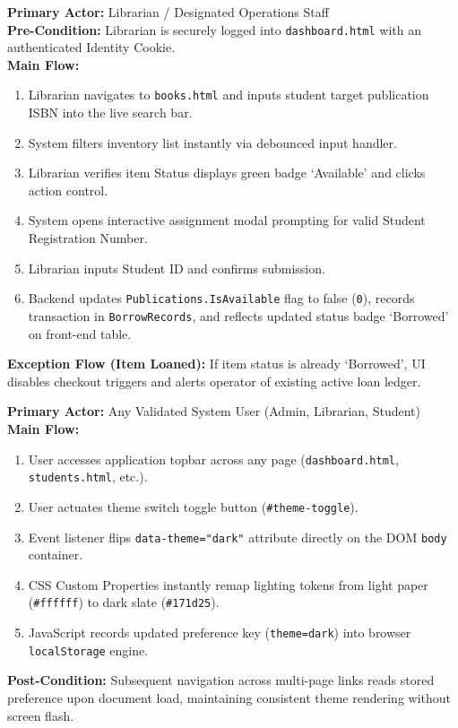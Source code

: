 \documentclass[10pt,journal,compsoc]{IEEEtran}
\begin{document}
\begin{engbox}
\textbf{Primary Actor:} Librarian / Designated Operations Staff\\
\textbf{Pre-Condition:} Librarian is securely logged into \texttt{dashboard.html} with an authenticated Identity Cookie.\\
\textbf{Main Flow:}
\begin{enumerate}[leftmargin=1.2em, topsep=2pt, itemsep=1pt]
    \item Librarian navigates to \texttt{books.html} and inputs student target publication ISBN into the live search bar.
    \item System filters inventory list instantly via debounced input handler.
    \item Librarian verifies item Status displays green badge `Available' and clicks action control.
    \item System opens interactive assignment modal prompting for valid Student Registration Number.
    \item Librarian inputs Student ID and confirms submission.
    \item Backend updates \texttt{Publications.IsAvailable} flag to false (\texttt{0}), records transaction in \texttt{BorrowRecords}, and reflects updated status badge `Borrowed' on front-end table.
\end{enumerate}
\textbf{Exception Flow (Item Loaned):} If item status is already `Borrowed', UI disables checkout triggers and alerts operator of existing active loan ledger.
\end{engbox}

\begin{engbox}
\textbf{Primary Actor:} Any Validated System User (Admin, Librarian, Student)\\
\textbf{Main Flow:}
\begin{enumerate}[leftmargin=1.2em, topsep=2pt, itemsep=1pt]
    \item User accesses application topbar across any page (\texttt{dashboard.html}, \texttt{students.html}, etc.).
    \item User actuates theme switch toggle button (\texttt{\#theme-toggle}).
    \item Event listener flips \texttt{data-theme="dark"} attribute directly on the DOM \texttt{body} container.
    \item CSS Custom Properties instantly remap lighting tokens from light paper (\texttt{\#ffffff}) to dark slate (\texttt{\#171d25}).
    \item JavaScript records updated preference key (\texttt{theme=dark}) into browser \texttt{localStorage} engine.
\end{enumerate}
\textbf{Post-Condition:} Subsequent navigation across multi-page links reads stored preference upon document load, maintaining consistent theme rendering without screen flash.
\end{engbox}
\end{document}
